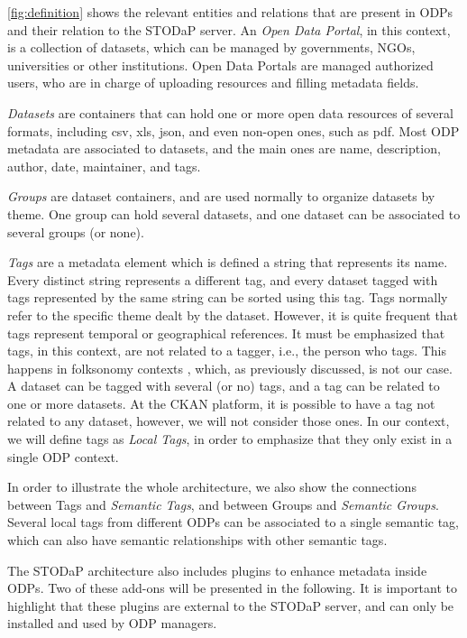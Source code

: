 \autoref{fig:definition} shows the relevant entities and relations that are present in ODPs and their relation to the STODaP server.
An \emph{Open Data Portal}, in this context, is a collection of datasets, which can be managed by governments, NGOs, universities or other institutions.
Open Data Portals are managed authorized users, who are in charge of uploading resources and filling metadata fields.

\emph{Datasets} are containers that can hold one or more open data resources of several formats, including csv, xls, json, and even non-open ones, such as pdf.
Most ODP metadata are associated to datasets, and the main ones are name, description, author, date, maintainer, and tags.

\emph{Groups} are dataset containers, and are used normally to organize datasets by theme. One group can hold several datasets, and one dataset can be associated to several groups (or none).

\emph{Tags} are a metadata element which is defined a string that represents its name.
Every distinct string represents a different tag, and every dataset tagged with tags represented by the same string can be sorted using this tag.
Tags normally refer to the specific theme dealt by the dataset.
However, it is quite frequent that tags represent temporal or geographical references.
It must be emphasized that tags, in this context, are not related to a tagger, i.e., the person who tags.
This happens in folksonomy contexts \cite{Grubber2007}, which, as previously discussed, is not our case.
A dataset can be tagged with several (or no) tags, and a tag can be related to one or more datasets.
At the CKAN platform, it is possible to have a tag not related to any dataset, however, we will not consider those ones.
In our context, we will define tags as \emph{Local Tags}, in order to emphasize that they only exist in a single ODP context.

In order to illustrate the whole architecture, we also show the connections between Tags and \emph{Semantic Tags}, and between Groups and \emph{Semantic Groups}.
Several local tags from different ODPs can be associated to a single semantic tag, which can also have semantic relationships with other semantic tags.

The STODaP architecture also includes plugins to enhance metadata inside ODPs.
Two of these add-ons will be presented in the following.
It is important to highlight that these plugins are external to the STODaP server, and can only be installed and used by ODP managers.

